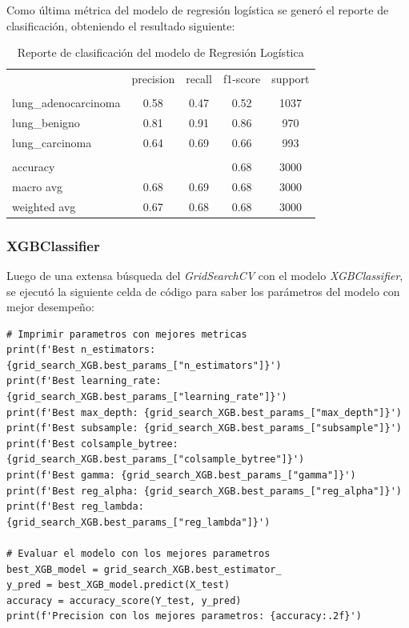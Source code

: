 Como última métrica del modelo de regresión logística se generó el reporte de clasificación, obteniendo el resultado siguiente: 

\begin{table}[H]
    \centering
    \begin{tabular}{l c c c c}

         & precision & recall & f1-score & support \\
        \\
        lung\_adenocarcinoma & 0.58 & 0.47 & 0.52 & 1037 \\
        lung\_benigno & 0.81 & 0.91 & 0.86 & 970 \\
        lung\_carcinoma & 0.64 & 0.69 & 0.66 & 993 \\
        \\
        accuracy &  &  & 0.68 & 3000 \\
        macro avg & 0.68 & 0.69 & 0.68 & 3000 \\
        weighted avg & 0.67 & 0.68 & 0.68 & 3000
        
    \end{tabular}
    \caption{Reporte de clasificación del modelo de Regresión Logística}
\end{table}

\subsubsection{XGBClassifier}

Luego de una extensa búsqueda del \textit{GridSearchCV} con el modelo \textit{XGBClassifier}, se ejecutó la siguiente celda de código para saber los parámetros del modelo con mejor desempeño:


\begin{lstlisting}[caption={Código para impresión de parámetros con mejor desempeño y evaluación del modelo}]
# Imprimir parametros con mejores metricas
print(f'Best n_estimators: {grid_search_XGB.best_params_["n_estimators"]}')
print(f'Best learning_rate: {grid_search_XGB.best_params_["learning_rate"]}')
print(f'Best max_depth: {grid_search_XGB.best_params_["max_depth"]}')
print(f'Best subsample: {grid_search_XGB.best_params_["subsample"]}')
print(f'Best colsample_bytree: {grid_search_XGB.best_params_["colsample_bytree"]}')
print(f'Best gamma: {grid_search_XGB.best_params_["gamma"]}')
print(f'Best reg_alpha: {grid_search_XGB.best_params_["reg_alpha"]}')
print(f'Best reg_lambda: {grid_search_XGB.best_params_["reg_lambda"]}')

# Evaluar el modelo con los mejores parametros
best_XGB_model = grid_search_XGB.best_estimator_
y_pred = best_XGB_model.predict(X_test)
accuracy = accuracy_score(Y_test, y_pred)
print(f'Precision con los mejores parametros: {accuracy:.2f}')
\end{lstlisting}

